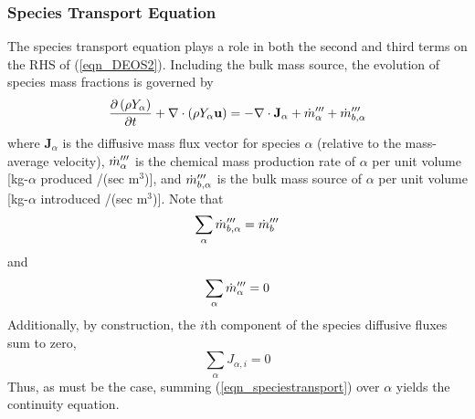 \documentclass[11pt]{book}
\begin{document}
\subsubsection{Species Transport Equation}
\label{species_transport}

The species transport equation plays a role in both the second and third terms on the RHS of (\ref{eqn_DEOS2}).  Including the bulk mass source, the evolution of species mass fractions is governed by
\begin{equation}
\label{eqn_speciestransport}
\frac{\partial \left(\rho Y_\alpha\right)}{\partial t} + \nabla\cdot \left(\rho Y_\alpha \mathbf{u}\right)  = - \nabla\cdot \mathbf{J}_{\alpha} + \dot{m}_\alpha^{{\prime\prime\prime}} + \dot{m}_{b,\alpha}^{{\prime\prime\prime}}
\end{equation}
where $\mathbf{J}_{\alpha}$ is the diffusive mass flux vector for species $\alpha$ (relative to the mass-average velocity),
$\dot{m}_\alpha^{{\prime\prime\prime}}$ is the chemical mass production rate of $\alpha$ per unit volume [kg-$\alpha$ produced /(sec m$^3$)],
and $\dot{m}_{b,\alpha}^{{\prime\prime\prime}}$ is the bulk mass source of $\alpha$ per unit volume [kg-$\alpha$ introduced /(sec m$^3$)].  Note that
\begin{equation}
\label{eqn_bulksum}
\sum_\alpha \dot{m}_{b,\alpha}^{{\prime\prime\prime}} = \dot{m}_b^{{\prime\prime\prime}}
\end{equation}
and
\begin{equation}
\label{eqn_massconservation}
\sum_\alpha \dot{m}_\alpha^{{\prime\prime\prime}} = 0
\end{equation}
Additionally, by construction, the $i$th component of the species diffusive fluxes sum to zero,
\begin{equation}
\label{eqn_sumdiffflux}
\sum_\alpha J_{\alpha,i} = 0
\end{equation}
Thus, as must be the case, summing (\ref{eqn_speciestransport}) over $\alpha$ yields the continuity equation.
\end{document}

